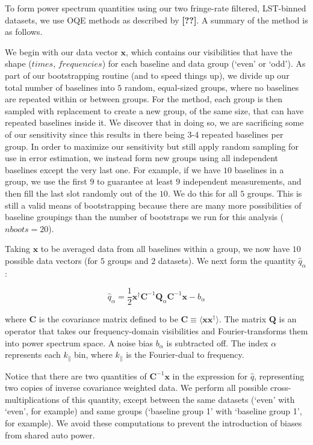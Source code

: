 \documentclass[preprint2,numberedappendix,tighten,twocolappendix]{aastex6}  %
\newcommand{\cc}[1]{{\color{purple} \textbf{[#1]}}}
\begin{document}
To form power spectrum quantities using our two fringe-rate filtered, LST-binned datasets, we use OQE methods as described by \cc{??}. A summary of the method is as follows. 

We begin with our data vector $\textbf{x}$, which contains our visibilities that have the shape ($times$, $frequencies$) for each baseline and data group (`even' or `odd'). As part of our bootstrapping routine (and to speed things up), we divide up our total number of baselines into $5$ random, equal-sized groups, where no baselines are repeated within or between groups. For the \citet{ali_et_al2015} method, each group is then sampled with replacement to create a new group, of the same size, that can have repeated baselines inside it. We discover that in doing so, we are sacrificing some of our sensitivity since this results in there being 3-4 repeated baselines per group. In order to maximize our sensitivity but still apply random sampling for use in error estimation, we instead form new groups using all independent baselines except the very last one. For example, if we have $10$ baselines in a group, we use the first $9$ to guarantee at least $9$ independent measurements, and then fill the last slot randomly out of the $10$. We do this for all $5$ groups. This is still a valid means of bootstrapping because there are many more possibilities of baseline groupings than the number of bootstraps we run for this analysis ($nboots = 20$).

Taking $\textbf{x}$ to be averaged data from all baselines within a group, we now have $10$ possible data vectors (for $5$ groups and $2$ datasets). We next form the quantity $\hat{q}_{\alpha}$:

\begin{equation}
\hat{q}_{\alpha} = \frac{1}{2}\textbf{x}^{\dagger}\textbf{C}^{-1}\textbf{Q}_{\alpha}\textbf{C}^{-1}\textbf{x}-b_{\alpha}
\end{equation}

where $\textbf{C}$ is the covariance matrix defined to be $\textbf{C} \equiv \langle\textbf{x}\textbf{x}^{\dagger}\rangle$. The matrix $\textbf{Q}$ is an operator that takes our frequency-domain visibilities and Fourier-transforms them into power spectrum space. A noise bias $b_{\alpha}$ is subtracted off. The index $\alpha$ represents each $k_{\parallel}$ bin, where $k_{\parallel}$ is the Fourier-dual to frequency.

Notice that there are two quantities of $\textbf{C}^{-1}\textbf{x}$ in the expression for $\hat{q}$, representing two copies of inverse covariance weighted data. We perform all possible cross-multiplications of this quantity, except between the same datasets (`even' with `even', for example) and same groups (`baseline group 1' with `baseline group 1', for example). We avoid these computations to prevent the introduction of biases from shared auto power.
\end{document}

